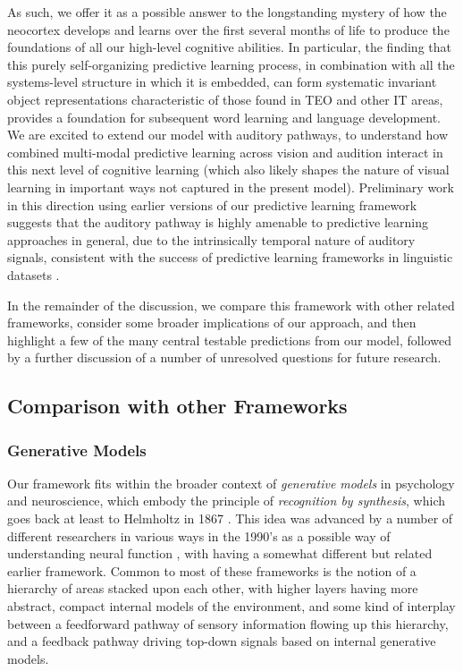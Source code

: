 \documentclass[11pt,twoside]{article}
\newif\myifpdf
\begin{document}
As such, we offer it as a possible answer to the longstanding mystery of how the neocortex develops and learns over the first several months of life to produce the foundations of all our high-level cognitive abilities.  In particular, the finding that this purely self-organizing predictive learning process, in combination with all the systems-level structure in which it is embedded, can form systematic invariant object representations characteristic of those found in TEO and other IT areas, provides a foundation for subsequent word learning and language development.  We are excited to extend our model with auditory pathways, to understand how combined multi-modal predictive learning across vision and audition interact in this next level of cognitive learning (which also likely shapes the nature of visual learning in important ways not captured in the present model).  Preliminary work in this direction using earlier versions of our predictive learning framework suggests that the auditory pathway is highly amenable to predictive learning approaches in general, due to the intrinsically temporal nature of auditory signals, consistent with the success of predictive learning frameworks in linguistic datasets \cite{Elman90,Elman91,MikolovSutskeverChenEtAl13}.

In the remainder of the discussion, we compare this framework with other related frameworks, consider some broader implications of our approach, and then highlight a few of the many central testable predictions from our model, followed by a further discussion of a number of unresolved questions for future research.

\subsection{Comparison with other Frameworks}

\subsubsection{Generative Models}

Our framework fits within the broader context of {\em generative models} in psychology and neuroscience, which embody the principle of {\em recognition by synthesis}, which goes back at least to Helmholtz in 1867 .  This idea was advanced by a number of different researchers in various ways in the 1990's as a possible way of understanding neural function \cite{Mumford92,KawatoHayakawaInui93,Ullman95,DayanHintonNealEtAl95,RaoBallard99}, with  having a somewhat different but related earlier framework.  Common to most of these frameworks is the notion of a hierarchy of areas stacked upon each other, with higher layers having more abstract, compact internal models of the environment, and some kind of interplay between a feedforward pathway of sensory information flowing up this hierarchy, and a feedback pathway driving top-down signals based on internal generative models.
\end{document}
